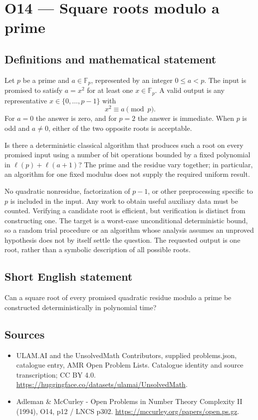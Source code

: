 \documentclass[11pt,a4paper]{article}
\begin{document}
\section*{O14 — Square roots modulo a prime}\label{statement}

\subsection{Definitions and mathematical statement}
Let $p$ be a prime and $a\in\mathbb F_p$, represented by an integer $0\le a<p$. The input is promised to satisfy $a=x^2$ for at least one $x\in\mathbb F_p$. A valid output is any representative $x\in\{0,\ldots,p-1\}$ with
\[
x^2\equiv a\pmod p.
\]
For $a=0$ the answer is zero, and for $p=2$ the answer is immediate. When $p$ is odd and $a\ne0$, either of the two opposite roots is acceptable.

Is there a deterministic classical algorithm that produces such a root on every promised input using a number of bit operations bounded by a fixed polynomial in $\ell(p)+\ell(a+1)$? The prime and the residue vary together; in particular, an algorithm for one fixed modulus does not supply the required uniform result.

No quadratic nonresidue, factorization of $p-1$, or other preprocessing specific to $p$ is included in the input. Any work to obtain useful auxiliary data must be counted. Verifying a candidate root is efficient, but verification is distinct from constructing one. The target is a worst-case unconditional deterministic bound, so a random trial procedure or an algorithm whose analysis assumes an unproved hypothesis does not by itself settle the question. The requested output is one root, rather than a symbolic description of all possible roots.
\subsection{Short English statement}
Can a square root of every promised quadratic residue modulo a prime be constructed deterministically in polynomial time?
\subsection{Sources}
\begin{itemize}
\item[S1] ULAM.AI and the UnsolvedMath Contributors, supplied problems.json, catalogue entry, AMR Open Problem Lists. Catalogue identity and source transcription; CC BY 4.0.
\url{https://huggingface.co/datasets/ulamai/UnsolvedMath}.
\item[S2] Adleman \& McCurley - Open Problems in Number Theory Complexity II (1994), O14, p12 / LNCS p302. 
\url{https://mccurley.org/papers/open.ps.gz}.
\end{itemize}
\end{document}
